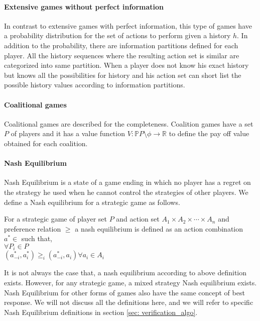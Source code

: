 \paragraph{Extensive games without perfect information}\cite{OR94}
In contrast to extensive games with perfect information, this type of games have a probability distribution for the set of actions to perform given a history $h$. In addition to the probability, there are information partitions defined for each player. All the history sequences where the resulting action set is similar are categorized into same partition. When a player does not know his exact history but knows all the possibilities for history and his action set can short list the possible history values according to information partitions.

\paragraph{Coalitional games}

Coalitional games are described for the completeness. Coalition games have a set $P$ of players and it has a value function $V : \mathbb{P} P \setminus \phi \rightarrow \mathbb{R}$ to define the pay off value obtained for each coalition.

\paragraph{Nash Equilibrium}\cite{OR94}
Nash Equilibrium is a state of a game ending in which no player has a regret on the strategy he used when he cannot control the strategies of other players. We define a Nash equilibrium for a strategic game as follows. \newline

\begin{definition}
	For a  strategic game of player set $P$ and action set $A_1\times A_2 \times \cdots \times A_n$ and preference relation $\geq$ a nash equilibrium is defined as an action combination $a^{*} \in $ such that, \\
$	\forall P_i \in P$ \\
$(a_{-i}^{*},a_i^{*}) \geq_i (a_{-i}^{*},a_i) \forall a_i \in A_i$
\end{definition}
It is not always the case that, a nash equilibrium according to above definition exists. However, for any strategic game, a mixed strategy Nash equilibrium exists. Nash Equilibrium for other forms of games also have the same concept of best response. We will not discuss all the definitions here, and we will refer to specific Nash Equilibrium definitions in section \ref{sec: verification_algo}.

